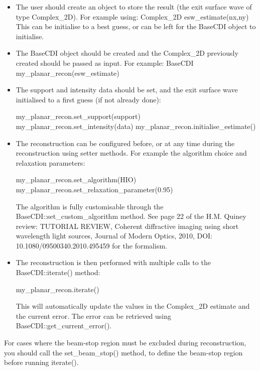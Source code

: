 \documentclass[]{nadia}
\begin{document}
\begin{itemize}

  \item The user should create an object to store the result (the exit
    surface wave of type Complex\_2D). For example using: Complex\_2D
    esw\_estimate(nx,ny) This can be initialise to a best guess, or can
    be left for the BaseCDI object to initialise.

  \item The BaseCDI object should be created and the Complex\_2D
    previously created should be passed as input. For example: BaseCDI
    my\_planar\_recon(esw\_estimate)

  \item The support and intensity data should be set, and the exit
    surface wave initialised to a first guess (if not already done):
    \begin{myverbatim}
    my_planar_recon.set_support(support) 
    my_planar_recon.set_intensity(data) 
    my_planar_recon.initialise_estimate()
    \end{myverbatim}

  \item The reconstruction can be configured before, or at any time
    during the reconstruction using setter methods. For example the
    algorithm choice and relaxation parameters:
    \begin{myverbatim}
    my_planar_recon.set_algorithm(HIO) 
    my_planar_recon.set_relaxation_parameter(0.95) 
    \end{myverbatim}
    The algorithm is fully customisable through the
    BaseCDI::set\_custom\_algorithm method. See page 22 of the H.M. Quiney
    review: TUTORIAL REVIEW, Coherent diffractive imaging using short
    wavelength light sources, Journal of Modern Optics, 2010, DOI:
    10.1080/09500340.2010.495459 for the formalism.

  \item The reconstruction is then performed with multiple calls to the
    BaseCDI::iterate() method:
    \begin{myverbatim}
    my_planar_recon.iterate() 
    \end{myverbatim}
    This will automatically update the values in the Complex\_2D estimate
    and the current error. The error can be retrieved using
    BaseCDI::get\_current\_error().
\end{itemize}

For cases where the beam-stop region must be excluded during
reconstruction, you should call the set\_beam\_stop() method, to define
the beam-stop region before running iterate().
\end{document}
